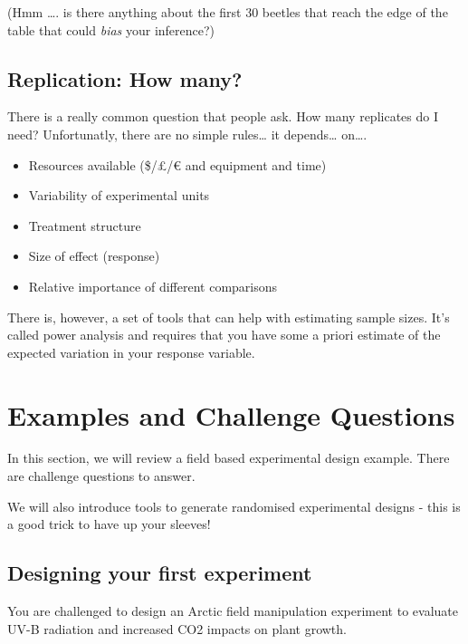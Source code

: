 \documentclass[
]{book}
\providecommand{\tightlist}{%
  \setlength{\itemsep}{0pt}\setlength{\parskip}{0pt}}
\begin{document}
(Hmm \ldots. is there anything about the first 30 beetles that reach the edge of the table that could \emph{bias} your inference?)

\hypertarget{replication-how-many}{%
\section{Replication: How many?}\label{replication-how-many}}

There is a really common question that people ask. How many replicates do I need? Unfortunatly, there are no simple rules\ldots{} it depends\ldots{} on\ldots.

\begin{itemize}
\tightlist
\item
  Resources available (\$/£/€ and equipment and time)
\item
  Variability of experimental units
\item
  Treatment structure
\item
  Size of effect (response)
\item
  Relative importance of different comparisons
\end{itemize}

There is, however, a set of tools that can help with estimating sample sizes. It's called power analysis and requires that you have some a priori estimate of the expected variation in your response variable.

\hypertarget{examples-and-challenge-questions}{%
\chapter{Examples and Challenge Questions}\label{examples-and-challenge-questions}}

In this section, we will review a field based experimental design example. There are challenge questions to answer.

We will also introduce tools to generate randomised experimental designs - this is a good trick to have up your sleeves!

\hypertarget{designing-your-first-experiment}{%
\section{Designing your first experiment}\label{designing-your-first-experiment}}

You are challenged to design an Arctic field manipulation experiment to evaluate UV-B radiation and increased CO2 impacts on plant growth.
\end{document}
